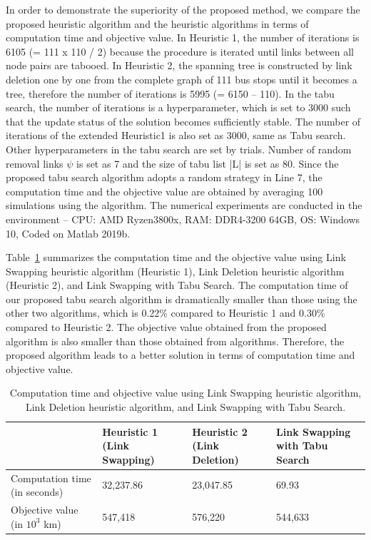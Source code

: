 \documentclass[10pt,english]{article}
\newcommand{\tabref}[1]{Table~\ref{#1}}
\begin{document}
In order to demonstrate the superiority of the proposed method, we compare the proposed heuristic algorithm and the \citet{Bell2020} heuristic algorithms in terms of computation time and objective value. In Heuristic 1, the number of iterations is 6105 (= 111 x 110 / 2) because the procedure is iterated until links between all node pairs are tabooed. In Heuristic 2, the spanning tree is constructed by link deletion one by one from the complete graph of 111 bus stops until it becomes a tree, therefore the number of iterations is 5995 (= 6150 -- 110). In the tabu search, the number of iterations is a hyperparameter, which is set to 3000 such that the update status of the solution becomes sufficiently stable. The number of iterations of the extended Heuristic1 is also set as 3000, same as Tabu search. Other hyperparameters in the tabu search are set by trials. Number of random removal links $\psi$ is set as 7 and the size of tabu list |L| is set as 80. Since the proposed tabu search algorithm adopts a random strategy in Line 7, the computation time and the objective value are obtained by averaging 100 simulations using the algorithm. The numerical experiments are conducted in the environment -- CPU: AMD Ryzen3800x, RAM: DDR4-3200 64GB, OS: Windows 10, Coded on Matlab 2019b.

\tabref{tab:computational_result} summarizes the computation time and the objective value using Link Swapping heuristic algorithm (Heuristic 1), Link Deletion heuristic algorithm (Heuristic 2), and Link Swapping with Tabu Search. The computation time of our proposed tabu search algorithm is dramatically smaller than those using the other two algorithms, which is 0.22\% compared to Heuristic 1 and 0.30\% compared to Heuristic 2. The objective value obtained from the proposed algorithm is also smaller than those obtained from \citet{Bell2020} algorithms. Therefore, the proposed algorithm leads to a better solution in terms of computation time and objective value.

\begin{table}[h]
\caption{Computation time and objective value using Link Swapping heuristic algorithm, Link Deletion heuristic algorithm, and Link Swapping with Tabu Search.}
\label{tab:computational_result}
\centering
\begin{tabular}{l p{8em} p{7em} p{8em} } \hline
   & Heuristic 1 (Link Swapping) & Heuristic 2 (Link Deletion) & Link Swapping with Tabu Search \\ \hline
  Computation time (in seconds) & 32,237.86 &	23,047.85	& 69.93 \\
  Objective value (in $10^3$ km) & 547,418 &	576,220	& 544,633 \\ \hline
\end{tabular}
\end{table}
\end{document}
